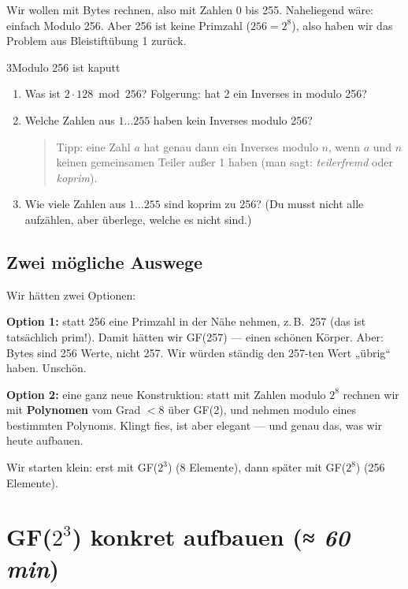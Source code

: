 Wir wollen mit Bytes rechnen, also mit Zahlen 0 bis 255. Naheliegend
wäre: einfach Modulo 256. Aber 256 ist keine Primzahl ($256 = 2^8$),
also haben wir das Problem aus Bleistiftübung 1 zurück.

\begin{bleistiftuebung}{3}{Modulo 256 ist kaputt}
\begin{enumerate}[label=(\alph*), leftmargin=*]
\item Was ist $2 \cdot 128 \bmod 256$? Folgerung: hat 2 ein Inverses
  in modulo 256?

\item Welche Zahlen aus $1 \dots 255$ haben kein Inverses modulo 256?

  \begin{quote}
  Tipp: eine Zahl $a$ hat genau dann ein Inverses modulo $n$, wenn
  $a$ und $n$ keinen gemeinsamen Teiler außer 1 haben (man sagt:
  \emph{teilerfremd} oder \emph{koprim}).
  \end{quote}

\item Wie viele Zahlen aus $1 \dots 255$ sind koprim zu 256? (Du
  musst nicht alle aufzählen, aber überlege, welche es nicht sind.)
\end{enumerate}
\end{bleistiftuebung}

\subsection*{Zwei mögliche Auswege}

Wir hätten zwei Optionen:

\textbf{Option 1:} statt 256 eine Primzahl in der Nähe nehmen,
z.\,B.\ 257 (das ist tatsächlich prim!). Damit hätten wir GF(257) —
einen schönen Körper. Aber: Bytes sind 256 Werte, nicht 257. Wir
würden ständig den 257-ten Wert „übrig“ haben. Unschön.

\textbf{Option 2:} eine ganz neue Konstruktion: statt mit Zahlen
modulo $2^8$ rechnen wir mit \textbf{Polynomen} vom Grad $< 8$ über
GF(2), und nehmen modulo eines bestimmten Polynoms. Klingt fies, ist
aber elegant — und genau das, was wir heute aufbauen.

Wir starten klein: erst mit GF($2^3$) (8 Elemente), dann später mit
GF($2^8$) (256 Elemente).

\section{GF($2^3$) konkret aufbauen \normalfont(\textit{≈ 60 min})}

